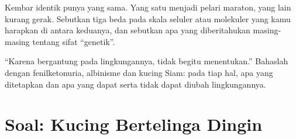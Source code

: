 \begin{exercise}[$\star\star\star$]\label{exo:g11:enzymes-and-phenotype:14}
Kembar identik punya  yang sama. Yang satu menjadi pelari
maraton, yang lain kurang gerak. Sebutkan tiga beda  pada skala
seluler atau molekuler yang kamu harapkan di antara keduanya, dan
sebutkan apa yang diberitahukan masing-masing tentang sifat ``genetik''.
\end{exercise}

\begin{exercise}[$\star\star\star$]\label{exo:g11:enzymes-and-phenotype:15}
``Karena  bergantung pada lingkungannya,  tidak
begitu menentukan.'' Bahaslah dengan fenilketonuria, albinisme dan
kucing Siam: pada tiap hal, apa yang ditetapkan  dan apa
yang dapat serta tidak dapat diubah lingkungannya.
\end{exercise}

\section{Soal: Kucing Bertelinga Dingin}

